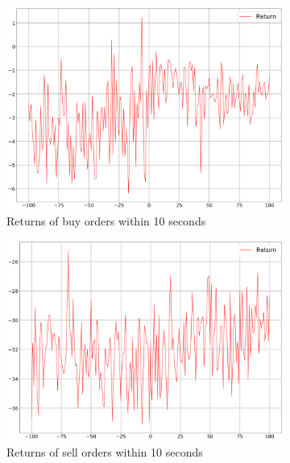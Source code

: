 \begin{figure}[H]
    \centering
    \begin{subfigure}[b]{0.45\textwidth}
        \includegraphics[width=\textwidth]{images/behaviour-10s-buy.png}
        \caption{Returns of buy orders within 10 seconds}
        \label{fig:behvaiour-down-10s-buy}
    \end{subfigure}
    \begin{subfigure}[b]{0.45\textwidth}
        \includegraphics[width=\textwidth]{images/behaviour-10s-sell.png}
        \caption{Returns of sell orders within 10 seconds}
        \label{fig:behvaiour-down-10s-sell}
    \end{subfigure}
    \begin{subfigure}[b]{0.45\textwidth}

\end{subfigure}
\end{figure}
